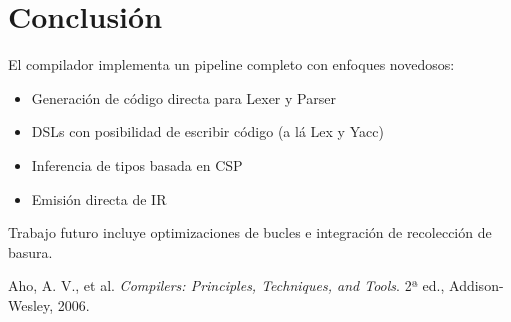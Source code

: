 \documentclass[11pt]{article}
\begin{document}
\section{Conclusión}
El compilador implementa un pipeline completo con enfoques novedosos:

\begin{itemize}
\item Generación de código directa para Lexer y Parser
\item DSLs con posibilidad de escribir código (a lá Lex y Yacc)
\item Inferencia de tipos basada en CSP
\item Emisión directa de IR
\end{itemize}

Trabajo futuro incluye optimizaciones de bucles e integración de recolección de basura.

\begin{thebibliography}{9}
Aho, A. V., et al. \textit{Compilers: Principles, Techniques, and Tools}. 2ª ed., Addison-Wesley, 2006.
\end{thebibliography}
\end{document}
